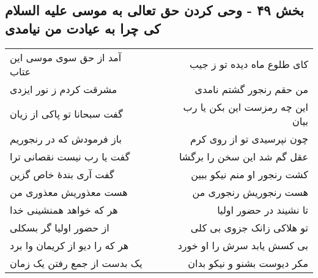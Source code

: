 \begin{center}
\section*{بخش ۴۹ - وحی کردن حق تعالی به موسی علیه السلام کی چرا به عیادت من نیامدی}
\label{sec:sh049}
\begin{longtable}{l p{0.5cm} r}
آمد از حق سوی موسی این عتاب
&&
کای طلوع ماه دیده تو ز جیب
\\
مشرقت کردم ز نور ایزدی
&&
من حقم رنجور گشتم نامدی
\\
گفت سبحانا تو پاکی از زیان
&&
این چه رمزست این بکن یا رب بیان
\\
باز فرمودش که در رنجوریم
&&
چون نپرسیدی تو از روی کرم
\\
گفت یا رب نیست نقصانی ترا
&&
عقل گم شد این سخن را برگشا
\\
گفت آری بندهٔ خاص گزین
&&
کشت رنجور او منم نیکو ببین
\\
هست معذوریش معذوری من
&&
هست رنجوریش رنجوری من
\\
هر که خواهد همنشینی خدا
&&
تا نشیند در حضور اولیا
\\
از حضور اولیا گر بسکلی
&&
تو هلاکی زانک جزوی بی کلی
\\
هر که را دیو از کریمان وا برد
&&
بی کسش یابد سرش را او خورد
\\
یک بدست از جمع رفتن یک زمان
&&
مکر دیوست بشنو و نیکو بدان
\\
\end{longtable}
\end{center}

